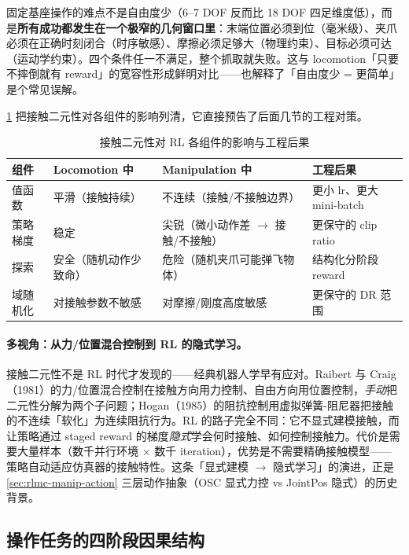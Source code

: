 \begin{insight}\label{ins:rlmc-manip-window}
固定基座操作的难点不是自由度少（6--7 DOF 反而比 18 DOF 四足维度低），而是\textbf{所有成功都发生在一个极窄的几何窗口里}：末端位置必须到位（毫米级）、夹爪必须在正确时刻闭合（时序敏感）、摩擦必须足够大（物理约束）、目标必须可达（运动学约束）。四个条件任一不满足，整个抓取就失败。这与 locomotion「只要不摔倒就有 reward」的宽容性形成鲜明对比——也解释了「自由度少 = 更简单」是个常见误解。
\end{insight}

\cref{tab:rlmc-manip-binary} 把接触二元性对各组件的影响列清，它直接预告了后面几节的工程对策。

\begin{table}[ht]
\centering
\small
\caption{接触二元性对 RL 各组件的影响与工程后果}
\label{tab:rlmc-manip-binary}
\begin{tabular}{@{}llll@{}}
\toprule
组件 & Locomotion 中 & Manipulation 中 & 工程后果 \\
\midrule
值函数 & 平滑（接触持续） & 不连续（接触/不接触边界） & 更小 lr、更大 mini-batch \\
策略梯度 & 稳定 & 尖锐（微小动作差 $\to$ 接触/不接触） & 更保守的 clip ratio \\
探索 & 安全（随机动作少致命） & 危险（随机夹爪可能弹飞物体） & 结构化分阶段 reward \\
域随机化 & 对接触参数不敏感 & 对摩擦/刚度高度敏感 & 更保守的 DR 范围 \\
\bottomrule
\end{tabular}
\end{table}

\paragraph{多视角：从力/位置混合控制到 RL 的隐式学习。}接触二元性不是 RL 时代才发现的——经典机器人学早有应对。Raibert 与 Craig（1981）的力/位置混合控制在接触方向用力控制、自由方向用位置控制，\emph{手动}把二元性分解为两个子问题；Hogan（1985）的阻抗控制用虚拟弹簧-阻尼器把接触的不连续「软化」为连续阻抗行为。RL 的路子完全不同：它不显式建模接触，而让策略通过 staged reward 的梯度\emph{隐式}学会何时接触、如何控制接触力。代价是需要大量样本（数千并行环境 $\times$ 数千 iteration），优势是不需要精确接触模型——策略自动适应仿真器的接触特性。这条「显式建模 $\to$ 隐式学习」的演进，正是 \cref{sec:rlmc-manip-action} 三层动作抽象（OSC 显式力控 vs JointPos 隐式）的历史背景。

\subsection{操作任务的四阶段因果结构}
\label{sec:rlmc-manip-fourstage}

